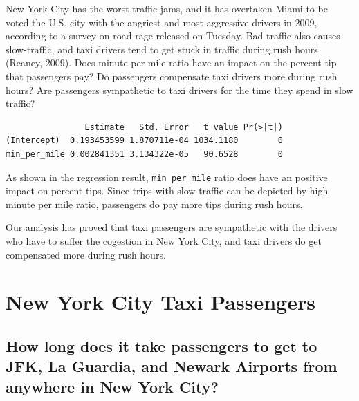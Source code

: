 \documentclass[12pt,twoside]{reedthesis}
\theoremstyle{definition}
\theoremstyle{definition}
\theoremstyle{definition}
\theoremstyle{remark}
\begin{document}
New York City has the worst traffic jams, and it has overtaken Miami to
be voted the U.S. city with the angriest and most aggressive drivers in
2009, according to a survey on road rage released on Tuesday. Bad
traffic also causes slow-traffic, and taxi drivers tend to get stuck in
traffic during rush hours (Reaney, 2009). Does minute per mile ratio
have an impact on the percent tip that passengers pay? Do passengers
compensate taxi drivers more during rush hours? Are passengers
sympathetic to taxi drivers for the time they spend in slow traffic?
\begin{verbatim}
                Estimate   Std. Error   t value Pr(>|t|)
(Intercept)  0.193453599 1.870711e-04 1034.1180        0
min_per_mile 0.002841351 3.134322e-05   90.6528        0
\end{verbatim}
As shown in the regression result, \texttt{min\_per\_mile} ratio does
have an positive impact on percent tips. Since trips with slow traffic
can be depicted by high minute per mile ratio, passengers do pay more
tips during rush hours.

Our analysis has proved that taxi passengers are sympathetic with the
drivers who have to suffer the cogestion in New York City, and taxi
drivers do get compensated more during rush hours.

\chapter{New York City Taxi Passengers}\label{chapter4}

\section{How long does it take passengers to get to JFK, La Guardia, and
Newark Airports from anywhere in New York
City?}\label{how-long-does-it-take-passengers-to-get-to-jfk-la-guardia-and-newark-airports-from-anywhere-in-new-york-city}
\end{document}

